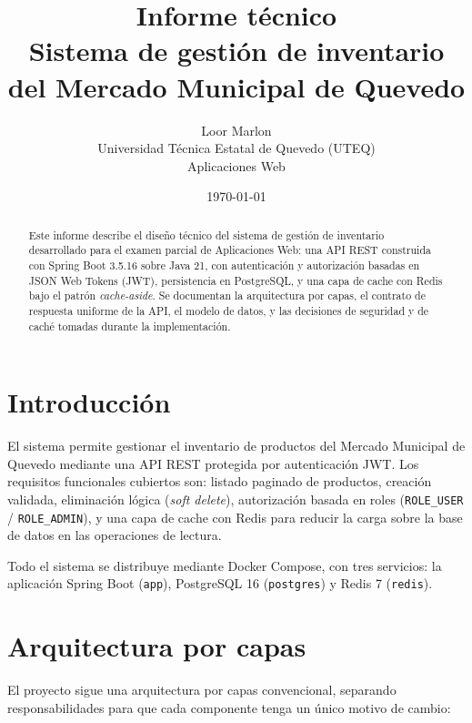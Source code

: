\documentclass[11pt,a4paper]{article}
\title{Informe técnico\\
Sistema de gestión de inventario del Mercado Municipal de Quevedo}
\author{Loor Marlon \\ Universidad Técnica Estatal de Quevedo (UTEQ) \\ Aplicaciones Web}
\date{\today}
\begin{document}
\maketitle

\begin{abstract}
Este informe describe el diseño técnico del sistema de gestión de inventario
desarrollado para el examen parcial de Aplicaciones Web: una API REST construida
con Spring Boot 3.5.16 sobre Java 21, con autenticación y autorización basadas en
JSON Web Tokens (JWT), persistencia en PostgreSQL, y una capa de cache con Redis
bajo el patrón \emph{cache-aside}. Se documentan la arquitectura por capas, el
contrato de respuesta uniforme de la API, el modelo de datos, y las decisiones de
seguridad y de caché tomadas durante la implementación.
\end{abstract}

\section{Introducción}

El sistema permite gestionar el inventario de productos del Mercado Municipal de
Quevedo mediante una API REST protegida por autenticación JWT. Los requisitos
funcionales cubiertos son: listado paginado de productos, creación validada,
eliminación lógica (\emph{soft delete}), autorización basada en roles
(\texttt{ROLE\_USER} / \texttt{ROLE\_ADMIN}), y una capa de cache con Redis para
reducir la carga sobre la base de datos en las operaciones de lectura.

Todo el sistema se distribuye mediante Docker Compose, con tres servicios:
la aplicación Spring Boot (\texttt{app}), PostgreSQL 16 (\texttt{postgres}) y
Redis 7 (\texttt{redis}).

\section{Arquitectura por capas}

El proyecto sigue una arquitectura por capas convencional, separando
responsabilidades para que cada componente tenga un único motivo de cambio:
\end{document}

